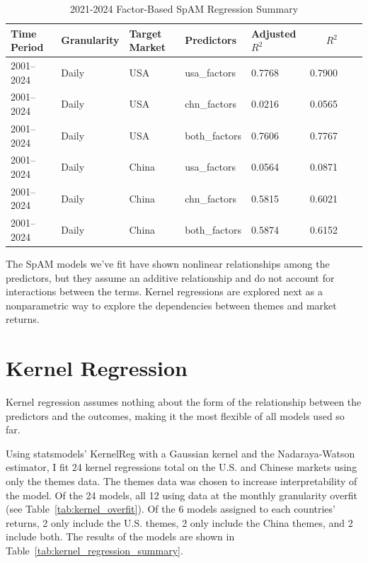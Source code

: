 \begin{table}[htbp]
\centering
\caption{2021-2024 Factor-Based SpAM Regression Summary}
\label{tab:spam_factors_summary_daily_full}
\begin{tabular}{@{}lllllrrr@{}}
\toprule
Time Period & Granularity & Target Market & Predictors     & Adjusted $R^2$ & $R^2$ \\ \midrule
2001--2024  & Daily       & USA           & usa\_factors   & 0.7768         & 0.7900 \\
2001--2024  & Daily       & USA           & chn\_factors   & 0.0216         & 0.0565 \\
2001--2024  & Daily       & USA           & both\_factors  & 0.7606         & 0.7767 \\
2001--2024  & Daily       & China         & usa\_factors   & 0.0564         & 0.0871 \\
2001--2024  & Daily       & China         & chn\_factors   & 0.5815         & 0.6021 \\
2001--2024  & Daily       & China         & both\_factors  & 0.5874         & 0.6152 \\ \bottomrule
\end{tabular}
\end{table}

The SpAM models we've fit have shown nonlinear relationships among the predictors, but they assume an additive relationship and do not account for interactions between the terms. Kernel regressions are explored next as a nonparametric way to explore the dependencies between themes and market returns.

\section{Kernel Regression}

Kernel regression assumes nothing about the form of the relationship between the predictors and the outcomes, making it the most flexible of all models used so far.

Using statsmodels' KernelReg with a Gaussian kernel and the Nadaraya-Watson estimator, I fit 24 kernel regressions total on the U.S. and Chinese markets using only the themes data. The themes data was chosen to increase interpretability of the model. Of the 24 models, all 12 using data at the monthly granularity overfit (see Table~\ref{tab:kernel_overfit}). Of the 6 models assigned to each countries' returns, 2 only include the U.S. themes, 2 only include the China themes, and 2 include both. The results of the models are shown in Table~\ref{tab:kernel_regression_summary}.

